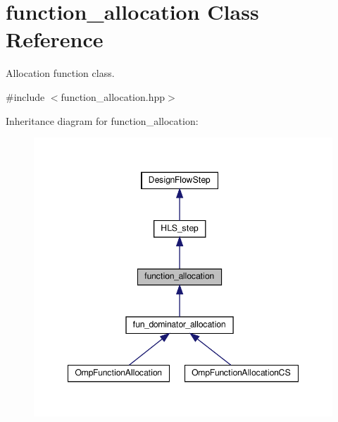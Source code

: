 \hypertarget{classfunction__allocation}{}\section{function\+\_\+allocation Class Reference}
\label{classfunction__allocation}


Allocation function class.  




{\ttfamily \#include $<$function\+\_\+allocation.\+hpp$>$}



Inheritance diagram for function\+\_\+allocation\+:
\nopagebreak
\begin{figure}[H]
\begin{center}
\leavevmode
\includegraphics[width=348pt]{d8/d75/classfunction__allocation__inherit__graph}
\end{center}
\end{figure}


